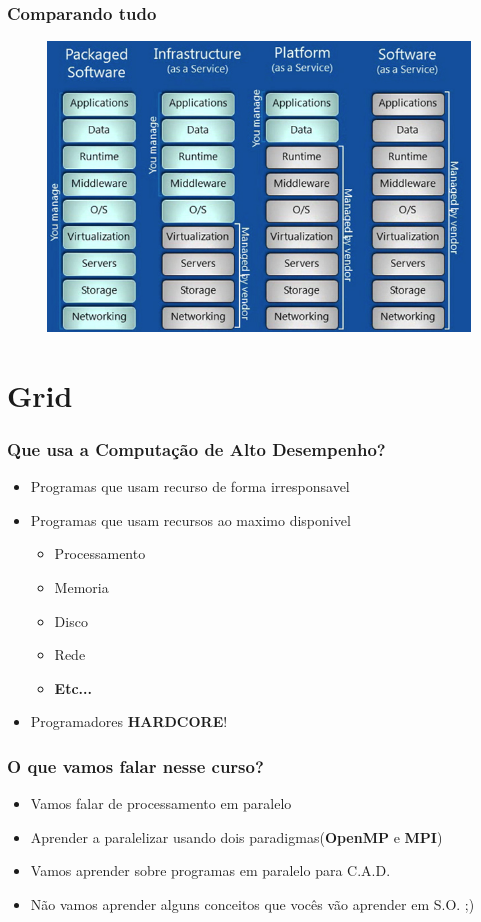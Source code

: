 \documentclass[10pt]{beamer}
\begin{document}
	\begin{frame}%
	\frametitle{Comparando tudo}
		\begin{figure}
		\centering
			\includegraphics[scale=0.4]{./figuras/iaas-paas-saas.jpg}
		\end{figure}
	\end{frame}

\section{Grid}
	\begin{frame}
	\frametitle{Que usa a Computação de Alto Desempenho?}
		\begin{itemize}
			\item Programas que usam recurso de forma irresponsavel
			\pause
			\item Programas que usam recursos ao maximo disponivel
			\pause
			\begin{itemize}
				\item Processamento
				\item Memoria
				\item Disco
				\item Rede
				\item \textbf{Etc...}
			\end{itemize}
			\pause
			\item Programadores \textbf{HARDCORE}!
		\end{itemize}
	\end{frame}

	\begin{frame}%
	\frametitle{O que vamos falar nesse curso?}
		\begin{itemize}[<-+>]
			\item Vamos falar de processamento em paralelo
			\item Aprender a paralelizar usando dois paradigmas(\textbf{OpenMP} e \textbf{MPI})
			\item Vamos aprender sobre programas em paralelo para C.A.D.
			\item Não vamos aprender alguns conceitos que vocês vão aprender em S.O. ;)
		\end{itemize}
	\end{frame}
\end{document}
